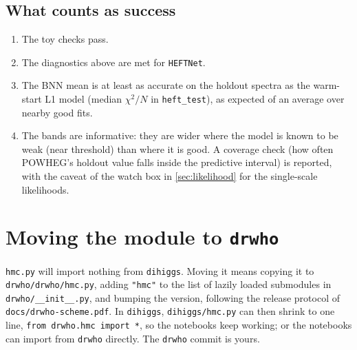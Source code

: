 \documentclass[11pt]{article}
\newcommand{\file}[1]{\nolinkurl{#1}}
\newcommand{\code}[1]{\texttt{#1}}
\begin{document}
\subsection{What counts as success}

\begin{enumerate}
  \item The toy checks pass.
  \item The diagnostics above are met for \code{HEFTNet}.
  \item The BNN mean is at least as accurate on the holdout spectra as the warm-start
    L1 model (median $\chi^2/N$ in \file{heft_test}), as expected of an average over
    nearby good fits.
  \item The bands are informative: they are wider where the model is known to be weak
    (near threshold) than where it is good. A coverage check (how often POWHEG's
    holdout value falls inside the predictive interval) is reported, with the caveat of
    the watch box in \cref{sec:likelihood} for the single-scale likelihoods.
\end{enumerate}

\section{Moving the module to \texttt{drwho}}
\label{sec:drwho}

\file{hmc.py} will import nothing from \code{dihiggs}. Moving it means copying it to
\file{drwho/drwho/hmc.py}, adding \code{"hmc"} to the list of lazily loaded
submodules in \file{drwho/__init__.py}, and bumping the version, following the release
protocol of \file{docs/drwho-scheme.pdf}. In \code{dihiggs}, \file{dihiggs/hmc.py} can
then shrink to one line, \code{from drwho.hmc import *}, so the notebooks keep working;
or the notebooks can import from \code{drwho} directly. The \code{drwho} commit is yours.

\end{document}
